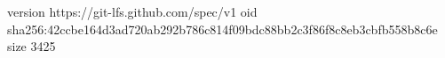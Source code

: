 version https://git-lfs.github.com/spec/v1
oid sha256:42ccbe164d3ad720ab292b786c814f09bdc88bb2c3f86f8c8eb3cbfb558b8c6e
size 3425
